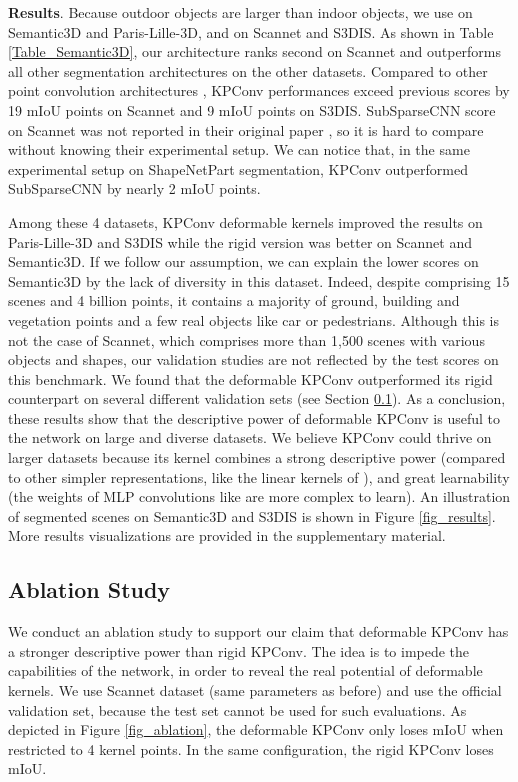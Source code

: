 \documentclass[10pt,twocolumn,letterpaper]{article}
\begin{document}
\noindent
\textbf{Results}. Because outdoor objects are larger than indoor objects, we use  on Semantic3D and Paris-Lille-3D, and  on Scannet and S3DIS. As shown in Table \ref{Table_Semantic3D}, our architecture ranks second on Scannet and outperforms all other segmentation architectures on the other datasets. Compared to other point convolution architectures \cite{atzmon2018point, li2018pointcnn, wang2018deep}, KPConv performances exceed previous scores by 19 mIoU points on Scannet and 9 mIoU points on S3DIS. SubSparseCNN score on Scannet was not reported in their original paper \cite{graham20183d}, so it is hard to compare without knowing their experimental setup. We can notice that, in the same experimental setup on ShapeNetPart segmentation, KPConv outperformed SubSparseCNN by nearly 2 mIoU points. 

Among these 4 datasets, KPConv deformable kernels improved the results on Paris-Lille-3D and S3DIS while the rigid version was better on Scannet and Semantic3D. If we follow our assumption, we can explain the lower scores on Semantic3D by the lack of diversity in this dataset. Indeed, despite comprising 15 scenes and 4 billion points, it contains a majority of ground, building and vegetation points and a few real objects like car or pedestrians. Although this is not the case of Scannet, which comprises more than 1,500 scenes with various objects and shapes, our validation studies are not reflected by the test scores on this benchmark. We found that the deformable KPConv outperformed its rigid counterpart on several different validation sets (see Section \ref{section_43}). As a conclusion, these results show that the descriptive power of deformable KPConv is useful to the network on large and diverse datasets. We believe KPConv could thrive on larger datasets because its kernel combines a strong descriptive power (compared to other simpler representations, like the linear kernels of \cite{groh2018flex}), and great learnability (the weights of MLP convolutions like \cite{li2018pointcnn, wang2018deep} are more complex to learn). An illustration of segmented scenes on Semantic3D and S3DIS is shown in Figure \ref{fig_results}. More results visualizations are provided in the supplementary material. 

\subsection{Ablation Study}
\label{section_43}

We conduct an ablation study to support our claim that deformable KPConv has a stronger descriptive power than rigid KPConv. The idea is to impede the capabilities of the network, in order to reveal the real potential of deformable kernels. We use Scannet dataset (same parameters as before) and use the official validation set, because the test set cannot be used for such evaluations. As depicted in Figure \ref{fig_ablation}, the deformable KPConv only loses  mIoU when restricted to 4 kernel points. In the same configuration, the rigid KPConv loses  mIoU.
\end{document}
